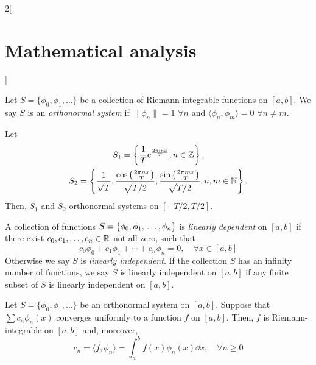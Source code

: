 \documentclass[../../../main.tex]{subfiles}
\begin{document}
\begin{multicols}{2}[\section{Mathematical analysis}]
\begin{definition}
  \end{definition}
  \begin{definition}
    Let $S=\{\phi_0,\phi_1,\ldots\}$ be a collection of Riemann-integrable functions on $[a,b]$. We say $S$ is an \emph{orthonormal system} if $\|\phi_n\|=1$ $\forall n$ and $\langle\phi_n,\phi_m\rangle=0$ $\forall n\ne m$.
  \end{definition}
  \begin{proposition}
    Let \begin{gather*}
      S_1=\left\{\frac{1}{T}\mathrm{e}^{\frac{2\pi\mathrm{i} nx}{T}},n\in\mathbb{Z} \right\},\\ S_2=\left\{\frac{1}{\sqrt{T}},\frac{\cos\left(\frac{2\pi nx}{T}\right)}{\sqrt{T/2}},\frac{\sin\left(\frac{2\pi mx}{T}\right)}{\sqrt{T/2}},n,m\in\mathbb{N} \right\}.
    \end{gather*} Then, $S_1$ and $S_2$ orthonormal systems on $[-T/2,T/2]$.
  \end{proposition}
  \begin{definition}
    A collection of functions $S=\{\phi_0,\phi_1,\\\ldots,\phi_n\}$ is \emph{linearly dependent} on $[a,b]$ if there exist $c_0,c_1,\ldots,c_n\in\mathbb{R} $ not all zero, such that $$c_0\phi_0+c_1\phi_1+\cdots+c_n\phi_n=0,\quad\forall x\in[a,b]$$ Otherwise we say $S$ is \emph{linearly independent}. If the collection $S$ has an infinity number of functions, we say $S$ is linearly independent on $[a,b]$ if any finite subset of $S$ is linearly independent on $[a,b]$.
  \end{definition}
  \begin{theorem}
    Let $S=\{\phi_0,\phi_1,\ldots\}$ be an orthonormal system on $[a,b]$. Suppose that $\sum c_n\phi_n(x)$ converges uniformly to a function $f$ on $[a,b]$. Then, $f$ is Riemann-integrable on $[a,b]$ and, moreover, $$c_n=\langle f,\phi_n\rangle=\int_a^bf(x)\overline{\phi_n(x)}\dd{x},\quad\forall n\geq 0$$
  \end{theorem}

\end{multicols}
\end{document}
